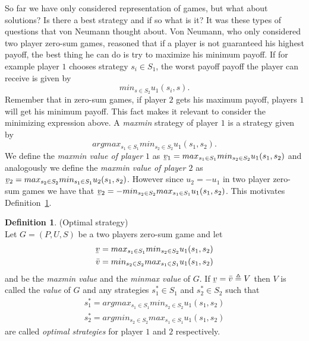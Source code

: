 \documentclass{article}
\theoremstyle{definition}
\newtheorem{definition}[theorem]{Definition}
\theoremstyle{remark}
\newcommand{\ubar}[1]{\underaccent{\bar}{#1}}
\begin{document}
So far we have
only considered representation of games, but what about solutions?
Is there a best strategy and if so what is it? It was these types of
questions that von Neumann thought about. Von Neumann, who only
considered two player zero-sum games, reasoned that if
a player is not guaranteed his highest payoff, the best thing he can
do is try to maximize his minimum payoff. If for example player $1$
chooses strategy $s_i \in S_1$, the worst payoff payoff the player can
receive is given by $$min_{s \in S_2} u_1(s_i,s).$$ Remember that in
zero-sum games, if player $2$ gets his maximum payoff, players $1$
will get his minimum payoff. This fact makes it relevant to consider
the minimizing expression above. A \emph{maxmin} strategy of player
$1$ is a strategy given by $$argmax_{s_1 \in S_1} min_{s_2 \in S_2}
u_1(s_1,s_2).$$ We define the \emph{maxmin value of player $1$} as
$\ubar{v}_1 = max_{s_1 \in S_1} min_{s_2 \in S_2}u_1(s_1,s_2)$ and
analogously we define the \emph{maxmin value of player $2$} as
$\ubar{v}_2 = max_{s_2 \in S_2} min_{s_1 \in
  S_1}u_2(s_1,s_2)$. However since $u_2 = -u_1$ in two player zero-sum
games we have that $\ubar{v}_2 = -min_{s_2 \in S_2} max_{s_1 \in S_1}
u_1(s_1,s_2)$. This motivates Definition~\ref{optimal strategy}.

\begin{definition} (Optimal strategy)\label{optimal strategy}\\

  Let $G = (P,U,S)$ be a two players zero-sum game and
  let 
\begin{equation}
\begin{gathered}
\ubar{v} = max_{s_1 \in S_1} min_{s_2 \in S_2}u_1(s_1,s_2) \\
\bar{v} = min_{s_2 \in S_2} max_{s_1 \in S_1}u_1(s_1,s_2)
\end{gathered}
\end{equation} and
   be the \emph{maxmin value} and the \emph{minmax value}
of $G$. If $\ubar{v} = \bar{v} \triangleq V$ then $V$ is called the
\emph{value} of $G$ and any strategies $s_1^* \in S_1$ and $s_2^* \in S_2$
such that 
\begin{equation}
\begin{gathered}
s_1^* = argmax_{s_1 \in S_1} min_{s_2 \in S_2}u_1(s_1,s_2) \\
s_2^* = argmin_{s_2 \in S_2} max_{s_1 \in S_1}u_1(s_1,s_2)
\end{gathered}
\end{equation}
are called \emph{optimal strategies} for player $1$ and
$2$ respectively. \citep{Maschler}
\end{definition}
\end{document}
